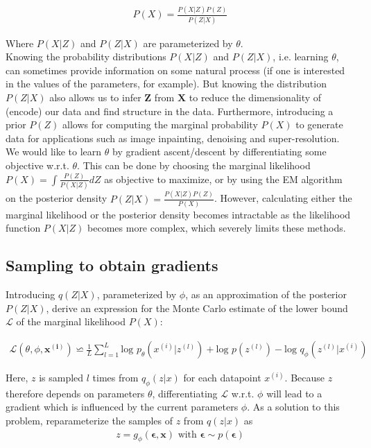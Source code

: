 \documentclass{article}
\begin{document}
\begin{align}
P(X) = \frac{P(X|Z)P(Z)}{P(Z|X)}
\end{align}

Where $P(X|Z)$ and $P(Z|X)$ are parameterized by $\theta$.
\\

Knowing the probability distributions $P(X|Z)$ and $P(Z|X)$, i.e. learning $\theta$, can sometimes provide information on some natural process (if one is interested in the values of the parameters, for example). But knowing the distribution $P(Z|X)$ also allows us to infer $\mathbf{Z}$ from $\mathbf{X}$ to reduce the dimensionality of (encode) our data and find structure in the data. Furthermore, introducing a prior $P(Z)$ allows for computing the marginal probability $P(X)$ to generate data for applications such as image inpainting, denoising and super-resolution.
We would like to learn $\theta$ by gradient ascent/descent by differentiating some objective w.r.t. $\theta$. This can be done by choosing the marginal likelihood $P(X) = \int \frac{P(Z)}{P(X|Z)}dZ$ as objective to maximize, or by using the EM algorithm on the posterior density $ P(Z|X) = \frac{P(X|Z)P(Z)}{P(X)}$. However, calculating either  the marginal likelihood or the posterior density becomes intractable as the likelihood function $P(X|Z)$	 becomes more complex, which severely limits these methods.

\subsection{Sampling to obtain gradients}

Introducing $q(Z|X)$, parameterized by $\phi$, as an approximation of the posterior $P(Z|X)$, \cite{kingma2013auto} derive an expression for the Monte Carlo estimate of the lower bound $\mathcal{L}$ of the marginal likelihood $P(X)$:

\begin{align}
\mathcal{L}(\theta ,\phi ,  \mathbf{x^{(i)}}) \backsimeq \frac{1}{L} \sum_{l=1}^{L} \text{log } p_{\theta} (x^{(i)}|z^{(l)})+ \text{log }p(z^{(l)}	)-\text{log }q_{\phi}(z^{(l)}|x^{(i)})
\end{align}

Here, $z$ is sampled $l$ times from $q_{\phi}(z|x)$ for each datapoint $x^{(i)}$. Because $z$ therefore depends on parameters $\theta$, differentiating $\mathcal{L}$ w.r.t. $\phi$ will lead to a gradient which is influenced by the current parameters $\phi$. 
As a solution to this problem, \cite{kingma2013auto} reparameterize the samples of $z$ from $q(z|x)$ as
\begin{align}
z = g_\phi(\mathbf{\epsilon},\mathbf{x}) \text{  with  } \mathbf{\epsilon} \sim p(\mathbf{\epsilon}) 
\end{align} 
\end{document}
